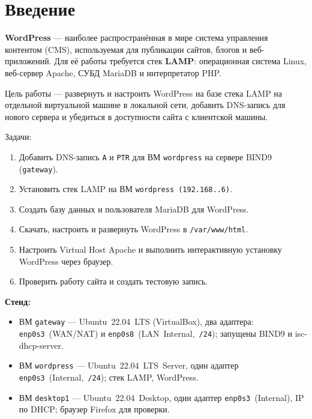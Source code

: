 \chapter*{Введение}
\label{ch:intro}

\textbf{WordPress} — наиболее распространённая в мире система управления
контентом (CMS), используемая для публикации сайтов, блогов и
веб-приложений. Для её работы требуется стек \textbf{LAMP}: операционная
система Linux, веб-сервер Apache, СУБД MariaDB и интерпретатор PHP.

Цель работы --- развернуть и настроить WordPress на базе стека LAMP
на отдельной виртуальной машине в локальной сети, добавить
DNS-запись для нового сервера и убедиться в доступности сайта
с клиентской машины.

Задачи:
\begin{enumerate}
  \item Добавить DNS-запись \texttt{A} и \texttt{PTR} для ВМ
        \texttt{wordpress} на сервере BIND9 (\texttt{gateway}).
  \item Установить стек LAMP на ВМ \texttt{wordpress
        (192.168.\cfgLabStudentN.6)}.
  \item Создать базу данных и пользователя MariaDB для WordPress.
  \item Скачать, настроить и развернуть WordPress в
        \texttt{/var/www/html}.
  \item Настроить Virtual Host Apache и выполнить интерактивную
        установку WordPress через браузер.
  \item Проверить работу сайта и создать тестовую запись.
\end{enumerate}

\textbf{Стенд:}
\begin{itemize}
  \item ВМ \texttt{gateway} --- Ubuntu~22.04~LTS (VirtualBox),
        два адаптера: \texttt{enp0s3}~(WAN/NAT) и
        \texttt{enp0s8}~(LAN~Internal,~\texttt{\cfgGwIP/24});
        запущены BIND9 и isc-dhcp-server.
  \item ВМ \texttt{wordpress} --- Ubuntu~22.04~LTS~Server, один адаптер
        \texttt{enp0s3}~(Internal,~\texttt{\cfgWpIP/24});
        стек LAMP, WordPress.
  \item ВМ \texttt{desktop1} --- Ubuntu~22.04~Desktop, один адаптер
        \texttt{enp0s3}~(Internal), IP по DHCP;
        браузер Firefox для проверки.
\end{itemize}

\endinput
